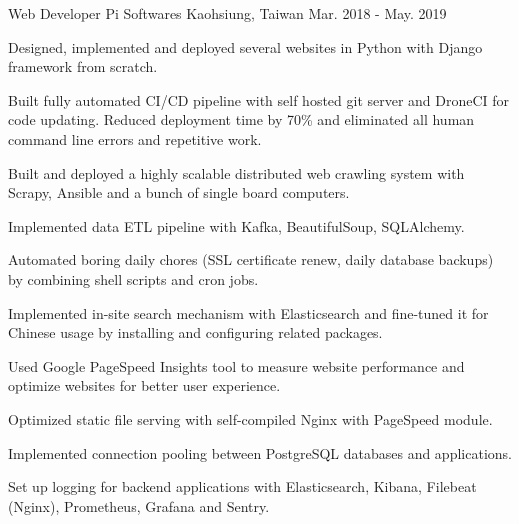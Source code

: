 \begin{cventries}
  \cventry
    {Web Developer} %
    {Pi Softwares} %
    {Kaohsiung, Taiwan} %
    {Mar. 2018 - May. 2019} %
    {
      \begin{cvitems} %
        \item {Designed, implemented and deployed several websites in Python with Django framework from scratch.}
        \item {Built fully automated CI/CD pipeline with self hosted git server and DroneCI for code updating. Reduced deployment time by 70\% and eliminated all human command line errors and repetitive work. }
        \item {Built and deployed a highly scalable distributed web crawling system with Scrapy, Ansible and a bunch of single board computers.}
        \item {Implemented data ETL pipeline with Kafka, BeautifulSoup, SQLAlchemy.}
        \item {Automated boring daily chores (SSL certificate renew, daily database backups) by combining shell scripts and cron jobs. }
        \item {Implemented in-site search mechanism with Elasticsearch and fine-tuned it for Chinese usage by installing and configuring related packages.}
        \item {Used Google PageSpeed Insights tool to measure website performance and optimize websites for better user experience. }
        \item {Optimized static file serving with self-compiled Nginx with PageSpeed module. }
        \item {Implemented connection pooling between PostgreSQL databases and applications.}
        \item {Set up logging for backend applications with Elasticsearch, Kibana, Filebeat (Nginx), Prometheus, Grafana and Sentry.}
      \end{cvitems}
    }

\end{cventries}
